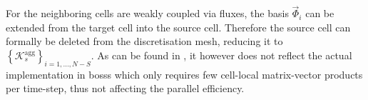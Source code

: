 	For the neighboring cells are weakly coupled via fluxes, the basis $\vec{\Phi}_i$ can be extended from the target cell into the source cell. Therefore the source cell can formally be deleted from the discretisation mesh, reducing it to $\left\{\mathcal{K}_s^\text{agg} \right\}_{i=1,...,N-S}$.
	As can be found in , it however does not reflect the actual implementation in \gls{bosss} which only requires few cell-local matrix-vector products per time-step, thus not affecting the parallel efficiency.
